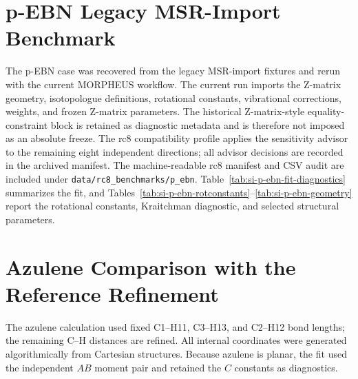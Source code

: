 \documentclass[12pt]{article}
\begin{document}
\section{p-EBN Legacy MSR-Import Benchmark}

The p-EBN case was recovered from the legacy MSR-import fixtures and rerun
with the current MORPHEUS workflow. The current run imports the Z-matrix
geometry, isotopologue definitions, rotational constants, vibrational
corrections, weights, and frozen Z-matrix parameters. The historical
Z-matrix-style equality-constraint block is retained as diagnostic metadata
and is therefore not imposed as an absolute freeze. The rc8 compatibility
profile applies the sensitivity advisor to the remaining eight independent
directions; all advisor decisions are recorded in the archived manifest.
The machine-readable rc8 manifest and CSV audit are included under
\texttt{data/rc8\_benchmarks/p\_ebn}.
Table~\ref{tab:si-p-ebn-fit-diagnostics} summarizes the fit, and
Tables~\ref{tab:si-p-ebn-rotconstants}--\ref{tab:si-p-ebn-geometry} report the
rotational constants, Kraitchman diagnostic, and selected structural
parameters.









\section{Azulene Comparison with the Reference Refinement}

The azulene calculation used fixed C1--H11, C3--H13, and C2--H12 bond lengths; the remaining C--H distances are refined. All internal coordinates were generated algorithmically from Cartesian structures. Because azulene is planar, the fit used the independent $AB$ moment pair and retained the $C$ constants as diagnostics.
\end{document}
